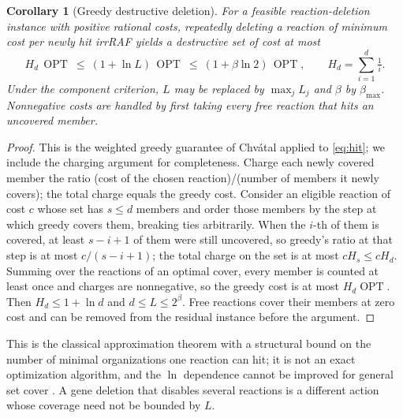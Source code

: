 \documentclass[11pt,a4paper]{article}
\theoremstyle{plain}
\newtheorem{corollary}[theorem]{Corollary}
\theoremstyle{definition}
\theoremstyle{remark}
\newcommand{\OPT}{\operatorname{OPT}}
\newcommand{\bmax}{\beta_{\max}}
\begin{document}
\begin{corollary}[Greedy destructive deletion]\label{cor:greedy}
For a feasible reaction-deletion instance with positive rational costs, repeatedly deleting a reaction of minimum cost per newly hit irrRAF yields a destructive set of cost at most
\begin{equation}\label{eq:greedy}
 H_d\,\OPT\ \le\ (1+\ln L)\,\OPT\ \le\ (1+\beta\ln2)\,\OPT,\qquad H_d=\sum_{i=1}^{d}\tfrac1i .
\end{equation}
Under the component criterion, $L$ may be replaced by $\max_jL_j$ and $\beta$ by $\bmax$. Nonnegative costs are handled by first taking every free reaction that hits an uncovered member.
\end{corollary}
\begin{proof}
This is the weighted greedy guarantee of Chv\'atal \cite{chvatal1979greedy} applied to \eqref{eq:hit}; we include the charging argument for completeness. Charge each newly covered member the ratio (cost of the chosen reaction)/(number of members it newly covers); the total charge equals the greedy cost. Consider an eligible reaction of cost $c$ whose set has $s\le d$ members and order those members by the step at which greedy covers them, breaking ties arbitrarily. When the $i$-th of them is covered, at least $s-i+1$ of them were still uncovered, so greedy's ratio at that step is at most $c/(s-i+1)$; the total charge on the set is at most $cH_s\le cH_d$. Summing over the reactions of an optimal cover, every member is counted at least once and charges are nonnegative, so the greedy cost is at most $H_d\OPT$. Then $H_d\le1+\ln d$ and $d\le L\le2^\beta$. Free reactions cover their members at zero cost and can be removed from the residual instance before the argument.
\end{proof}

This is the classical approximation theorem with a structural bound on the number of minimal organizations one reaction can hit; it is not an exact optimization algorithm, and the $\ln$ dependence cannot be improved for general set cover \cite{feige1998threshold,dinur2014analytical}. A gene deletion that disables several reactions is a different action whose coverage need not be bounded by $L$.
\end{document}
